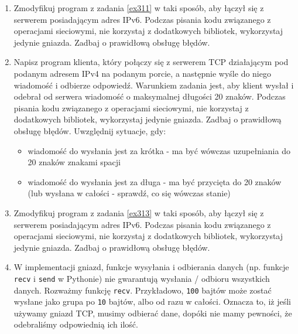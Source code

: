 \documentclass{article}
\begin{document}
\begin{enumerate}[label=\textbf{3.\arabic*}]
    \item Zmodyfikuj program z zadania \ref{ex311} w taki sposób,  aby łączył się z serwerem posiadającym adres IPv6. Podczas pisania kodu związanego z operacjami sieciowymi, nie korzystaj z dodatkowych bibliotek, wykorzystaj jedynie gniazda. Zadbaj o prawidłową obsługę błędów. 




    \item \label{ex313} Napisz program klienta, który połączy się z serwerem TCP działającym pod podanym adresem IPv4 na podanym porcie, a następnie wyśle do niego wiadomość i odbierze odpowiedź. Warunkiem zadania jest, aby klient wysłał i odebrał od serwera wiadomość o maksymalnej długości 20 znaków. Podczas pisania kodu związanego z operacjami sieciowymi, nie korzystaj z dodatkowych bibliotek, wykorzystaj jedynie gniazda. Zadbaj o prawidłową obsługę błędów.  Uwzględnij sytuacje, gdy:
    \begin{itemize}
    \item wiadomość do wysłania jest za krótka - ma być wówczas uzupełniania do 20 znaków znakami spacji
    \item wiadomość do wysłania jest za długa - ma być przycięta do 20 znaków (lub wysłana w całości - sprawdź, co się wówczas stanie)
    \end{itemize}
    
    
    \item Zmodyfikuj program z zadania \ref{ex313} w taki sposób,  aby łączył się z serwerem posiadającym adres IPv6. Podczas pisania kodu związanego z operacjami sieciowymi, nie korzystaj z dodatkowych bibliotek, wykorzystaj jedynie gniazda. Zadbaj o prawidłową obsługę błędów. 
    
\item \label{ex315}  W implementacji gniazd, funkcje wysyłania i odbierania danych (np. funkcje \texttt{recv} i \texttt{send} w Pythonie) nie gwarantują wysłania / odbioru wszystkich danych. Rozważmy funkcję \texttt{recv}. Przykładowo, \texttt{100} bajtów może zostać wysłane jako grupa po \texttt{10} bajtów, albo od razu w całości. Oznacza to, iż jeśli używamy gniazd TCP, musimy odbierać dane, dopóki nie mamy pewności, że odebraliśmy odpowiednią ich ilość.


\end{enumerate}
\end{document}
